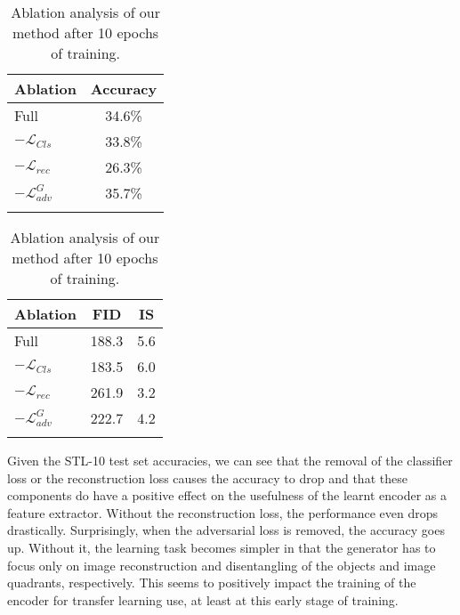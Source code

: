 \documentclass[a4paper,12pt]{report}
\begin{document}
\begin{table}[ht!]
    \begin{subtable}{.5\linewidth}
      \centering
        \begin{tabular}{l c}
        \Xhline{0.8pt}
        \textbf{Ablation} & \textbf{Accuracy} \\
        \hline
        Full & 34.6\% \\ %
        $-\mathcal{L}_{Cls}$ & 33.8\% \\ %
        $-\mathcal{L}_{rec}$ & 26.3\% \\ %
        $-\mathcal{L}^G_{adv}$ & 35.7\% \\ %
        \Xhline{0.8pt}
        \end{tabular}
        \caption{STL-10 test set accuracy}
    \end{subtable}%
    \begin{subtable}{.5\linewidth}
      \centering
        \begin{tabular}{l c c}
        \Xhline{0.8pt}
        \textbf{Ablation} & \textbf{FID} & \textbf{IS} \\
        \hline
        Full & 188.3 & 5.6\\ %
        $-\mathcal{L}_{Cls}$ & 183.5 & 6.0\\ %
        $-\mathcal{L}_{rec}$ & 261.9 & 3.2\\ %
        $-\mathcal{L}^G_{adv}$ & 222.7 & 4.2\\ %
        \Xhline{0.8pt}
        \end{tabular}
        \caption{FID and IS results}
    \end{subtable} 
    \caption{Ablation analysis of our method after 10 epochs of training.}
    \label{tab:ablation_stl10}
\end{table}

Given the STL-10 test set accuracies, we can see that the removal of the classifier loss or the reconstruction loss causes the accuracy to drop and that these components do have a positive effect on the usefulness of the learnt encoder as a feature extractor. Without the reconstruction loss, the performance even drops drastically. Surprisingly, when the adversarial loss is removed, the accuracy goes up. Without it, the learning task becomes simpler in that the generator has to focus only on image reconstruction and disentangling of the objects and image quadrants, respectively. This seems to positively impact the training of the encoder for transfer learning use, at least at this early stage of training. 
\end{document}
